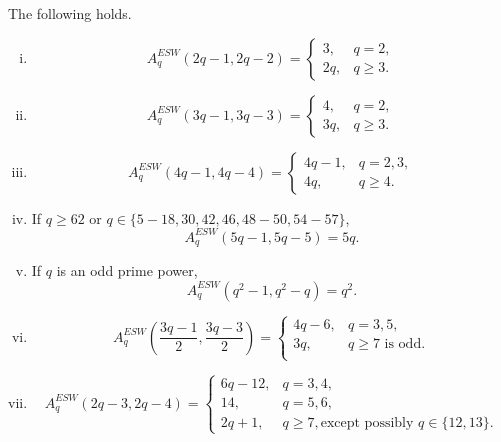 \documentclass[draft, 11pt]{article}
\begin{document}
\begin{theorem}\label{thm:main} The following holds.
 \begin{enumerate}[(i)]
 \item \begin{equation*}
  A^{ESW}_q(2q-1,2q-2)=
 \begin{cases}
 3,         & q=2,\\
 2q,    &q\geq 3.
 \end{cases}
 \end{equation*}

 \item \begin{equation*}
 A^{ESW}_q(3q-1,3q-3)=
 \begin{cases}
 4,    & q=2, \\
 3q,  &q\geq 3.
 \end{cases}
 \end{equation*}

 \item \begin{equation*}
 A^{ESW}_q(4q-1,4q-4)=
 \begin{cases}
 4q-1,        & q=2, 3,\\
 4q,  &q\geq 4.

 \end{cases}
 \end{equation*}


 \item If $q\ge 62$ or $q\in \{5-18,30,42,46,48-50,54-57\}$,
  \begin{equation*}
 A^{ESW}_q(5q-1,5q-5)=
 5q. %
 \end{equation*}
 
 \item If $q$ is an odd prime power,
 \begin{equation*}
 A^{ESW}_q(q^2-1,q^2-q)=
 q^2. %
 \end{equation*}

 \item \begin{equation*}
 A^{ESW}_q\left(\frac{3q-1}2,\frac{3q-3}{2}\right)=
 \begin{cases}
 4q-6,        & q=3, 5, \\
 3q,  &q\geq 7 \mbox{ is odd}.\\
 \end{cases}
 \end{equation*}
 
  \item \begin{equation*}
 A^{ESW}_q(2q-3,2q-4)=
 \begin{cases}
 6q-12,      & q=3,4, \\
 14,        &q=5,6,\\
 2q+1,      &q\geq 7, \mbox{except possibly $q\in\{12,13\}$.}
 \end{cases}
 \end{equation*}
 
 \end{enumerate}

\end{theorem}
\end{document}
